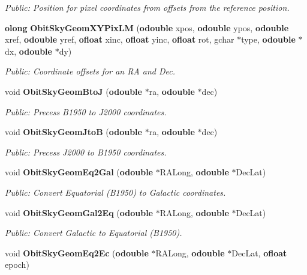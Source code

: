 \begin{CompactItemize}
\begin{CompactList}\small\item\em Public: Position for pixel coordinates from offsets from the reference position. \item\end{CompactList}\item 
{\bf olong} {\bf Obit\-Sky\-Geom\-XYPix\-LM} ({\bf odouble} xpos, {\bf odouble} ypos, {\bf odouble} xref, {\bf odouble} yref, {\bf ofloat} xinc, {\bf ofloat} yinc, {\bf ofloat} rot, gchar $\ast$type, {\bf odouble} $\ast$dx, {\bf odouble} $\ast$dy)
\begin{CompactList}\small\item\em Public: Coordinate offsets for an RA and Dec. \item\end{CompactList}\item 
void {\bf Obit\-Sky\-Geom\-Bto\-J} ({\bf odouble} $\ast$ra, {\bf odouble} $\ast$dec)
\begin{CompactList}\small\item\em Public: Precess B1950 to J2000 coordinates. \item\end{CompactList}\item 
void {\bf Obit\-Sky\-Geom\-Jto\-B} ({\bf odouble} $\ast$ra, {\bf odouble} $\ast$dec)
\begin{CompactList}\small\item\em Public: Precess J2000 to B1950 coordinates. \item\end{CompactList}\item 
void {\bf Obit\-Sky\-Geom\-Eq2Gal} ({\bf odouble} $\ast$RALong, {\bf odouble} $\ast$Dec\-Lat)
\begin{CompactList}\small\item\em Public: Convert Equatorial (B1950) to Galactic coordinates. \item\end{CompactList}\item 
void {\bf Obit\-Sky\-Geom\-Gal2Eq} ({\bf odouble} $\ast$RALong, {\bf odouble} $\ast$Dec\-Lat)
\begin{CompactList}\small\item\em Public: Convert Galactic to Equatorial (B1950). \item\end{CompactList}\item 
void {\bf Obit\-Sky\-Geom\-Eq2Ec} ({\bf odouble} $\ast$RALong, {\bf odouble} $\ast$Dec\-Lat, {\bf ofloat} epoch)

\end{CompactItemize}
